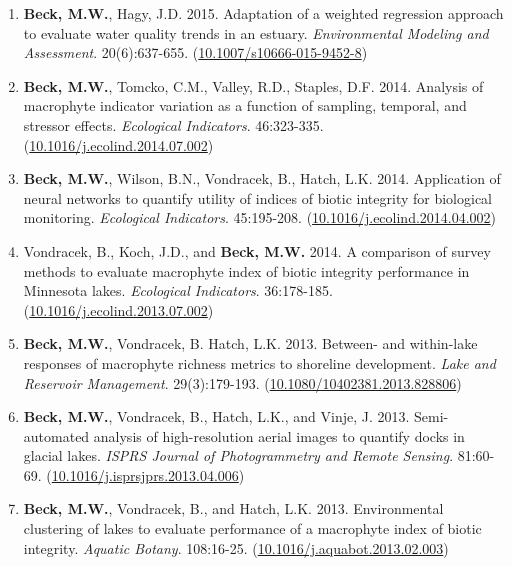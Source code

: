 \documentclass[letterpaper,12pt]{article}
\begin{document}
\begin{enumerate}
\item \textbf{Beck, M.W.}, Hagy, J.D. 2015. Adaptation of a weighted regression approach to evaluate water quality trends in an estuary. \textit{Environmental Modeling and Assessment}. 20(6):637-655. ({\footnotesize\href{http://dx.doi.org/10.1007/s10666-015-9452-8}{10.1007/s10666-015-9452-8}})

\item \textbf{Beck, M.W.}, Tomcko, C.M., Valley, R.D., Staples, D.F. 2014. Analysis of macrophyte indicator variation as a function of sampling, temporal, and stressor effects. \textit{Ecological Indicators}. 46:323-335. ({\footnotesize\href{https://doi.org/10.1016/j.ecolind.2014.07.002}{10.1016/j.ecolind.2014.07.002}})

\item \textbf{Beck, M.W.}, Wilson, B.N., Vondracek, B., Hatch, L.K. 2014. Application of neural networks to quantify utility of indices of biotic integrity for biological monitoring. \textit{Ecological Indicators}. 45:195-208. ({\footnotesize\href{https://doi.org/10.1016/j.ecolind.2014.04.002}{10.1016/j.ecolind.2014.04.002}})

\item Vondracek, B., Koch, J.D., and \textbf{Beck, M.W.} 2014. A comparison of survey methods to evaluate macrophyte index of biotic integrity performance in Minnesota lakes. \textit{Ecological Indicators}. 36:178-185. ({\footnotesize\href{https://doi.org/10.1016/j.ecolind.2013.07.002}{10.1016/j.ecolind.2013.07.002}})

\item \textbf{Beck, M.W.}, Vondracek, B. Hatch, L.K. 2013. Between- and within-lake responses of macrophyte richness metrics to shoreline development. \textit{Lake and Reservoir Management}. 29(3):179-193. ({\footnotesize\href{http://dx.doi.org/10.1080/10402381.2013.828806}{10.1080/10402381.2013.828806}})

\item \textbf{Beck, M.W.}, Vondracek, B., Hatch, L.K., and Vinje, J. 2013. Semi-automated analysis of high-resolution aerial images to quantify docks in glacial lakes. \textit{ISPRS Journal of Photogrammetry and Remote Sensing}. 81:60-69. ({\footnotesize\href{https://doi.org/10.1016/j.isprsjprs.2013.04.006}{10.1016/j.isprsjprs.2013.04.006}})

\item \textbf{Beck, M.W.}, Vondracek, B., and Hatch, L.K. 2013. Environmental clustering of lakes to evaluate performance of a macrophyte index of biotic integrity. \textit{Aquatic Botany}. 108:16-25. ({\footnotesize\href{https://doi.org/10.1016/j.aquabot.2013.02.003}{10.1016/j.aquabot.2013.02.003}})


\end{enumerate}
\end{document}

